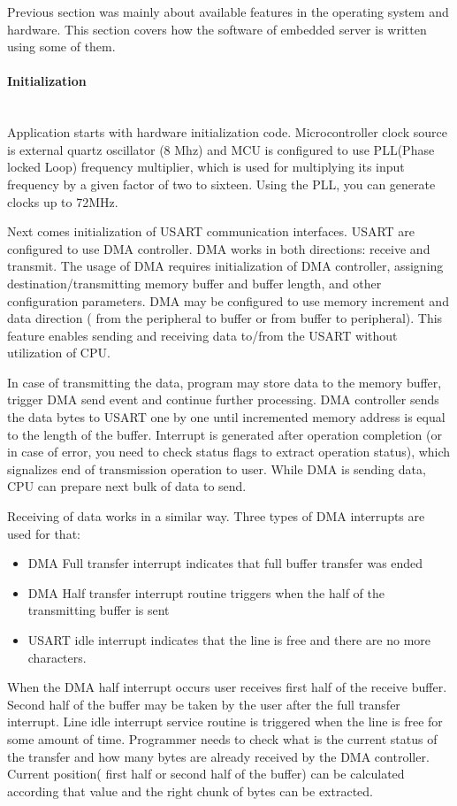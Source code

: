Previous section was mainly about available features in the operating system and
hardware. 
This section covers how the software of embedded server is written
using some of them.

\paragraph{Initialization} ~\\
Application starts with hardware initialization code. Microcontroller clock
source is external quartz oscillator (8 Mhz) and MCU is configured to use 
PLL(Phase locked Loop) frequency multiplier,  which is used for multiplying its
input frequency by a given factor of two to sixteen. 
Using the PLL, you can generate clocks up to 72MHz.

Next comes initialization of USART communication interfaces. USART are configured
to use DMA controller. DMA works in both directions: receive and
transmit. The usage of DMA requires initialization of DMA controller, assigning
destination/transmitting memory buffer and buffer length, and other configuration
parameters. DMA may be configured to use memory increment and data direction (
from the peripheral to buffer or from buffer to peripheral). This feature
enables sending and receiving data to/from the USART without utilization of
CPU.

In case of transmitting the data, program may store data to the memory
buffer, trigger DMA send event and continue further processing. DMA controller
sends the data bytes to USART one by one until incremented memory address is
equal to the length of the buffer. Interrupt is generated after operation
completion (or in case of error, you need to check status flags to extract
operation status), which signalizes end of transmission operation to user.
While DMA is sending data, CPU can prepare next bulk of data to send.

Receiving of data works in a similar way.
Three types of DMA interrupts are used for that:
\begin{itemize}
  \item DMA Full transfer interrupt indicates that full buffer transfer was
  ended
  \item DMA Half transfer interrupt routine triggers when the half of the
  transmitting buffer is sent
  \item USART idle interrupt indicates that the
  line is free and there are no more characters.
\end{itemize}  
When the DMA half interrupt occurs user receives first half of the receive
buffer. Second half of the buffer may be taken by the user after the full
transfer interrupt. Line idle interrupt service routine is triggered when the
line is free for some amount of time. Programmer needs to check what is the
current status of the transfer and how many bytes are already received by the
DMA controller. Current position( first half or second half of the buffer) can
be calculated according that value and the right chunk of bytes can be
extracted.

